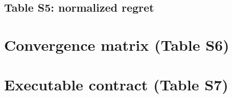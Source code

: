 \documentclass[10pt]{article}
\newenvironment{auditlandscape}{\begin{landscape}}{\end{landscape}}
\begin{document}
\subsection*{Table S5: normalized regret}
\begin{auditlandscape}
\begingroup\scriptsize\setlength{\tabcolsep}{2pt}

\endgroup
\end{auditlandscape}
\clearpage
\section{Convergence matrix (Table S6)}
\begin{auditlandscape}
\begingroup\scriptsize\setlength{\tabcolsep}{2pt}

\endgroup
\end{auditlandscape}
\clearpage
\section{Executable contract (Table S7)}
\begingroup\small

\endgroup
\end{document}
